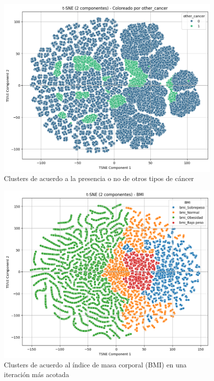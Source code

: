 \documentclass[10pt,journal,compsoc]{IEEEtran}
\begin{document}
\begin{figure}[htb]
    \centering
    \includegraphics[width=\linewidth]{imagenes/other_cancer.png}
    \caption{Clusters de acuerdo a la presencia o no de otros tipos de cáncer}
    \label{fig:tsne_other_cancer}
\end{figure}

\begin{figure}[htb]
    \centering
    \includegraphics[width=\linewidth]{imagenes/tsne_bmi2.png}
    \caption{Clusters de acuerdo al índice de masa corporal (BMI) en una iteración más acotada}
    \label{fig:tsne_bmi2}
\end{figure}
\end{document}
